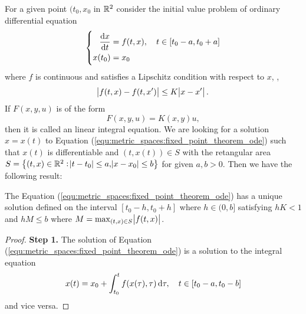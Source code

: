 \begin{example}
For a given point $(t_0, x_0$ in $\mathbb{R}^2$ consider the initial value problem 
of ordinary differential equation 
\begin{equation}
    \label{equ:metric_spaces:fixed_point_theorem_ode}
    \left\{
    \begin{aligned}
        \frac{\mathop{}\!\mathrm{d} x}{\mathop{}\!\mathrm{d} t} &= f(t, x), \quad
        t \in \left[ t_0 - a, t_0 + a \right] \\
        x(t_0) &= x_0
    \end{aligned}
    \right.
\end{equation}
where $f$ is continuous and satisfies a Lipschitz condition with respect to 
$x$, \ie, 
\begin{equation*}
    \abs{f(t, x) - f(t, x')} \le K \abs{x - x'}. 
\end{equation*}
If $F(x, y, u)$ is of the form 
\begin{equation*}
    F(x, y, u) = K(x, y)u, 
\end{equation*}
then it is called an linear integral equation. 
We are looking for a solution $x = x(t)$ to Equation 
(\ref{equ:metric_spaces:fixed_point_theorem_ode}) such that $x(t)$ is 
differentiable and $(t, x(t)) \in S$ with the retangular area $S = \left\{ 
(t, x) \in \mathbb{R}^2: \abs{t - t_0} \le a, \abs{x - x_0} \le b \right\}$ for 
given $a, b > 0$. 
Then we have the following result: 
\begin{thm}
The Equation (\ref{equ:metric_spaces:fixed_point_theorem_ode}) has a unique 
solution defined on the interval $[t_0 - h, t_0 + h]$ where $h \in (0, b]$ 
satisfying $h K < 1$ and $hM \le b$ where $M = \max_{(t, x) \in S} 
\abs{f(t, x)}$. 
\end{thm}
\begin{proof}
\textbf{Step 1.}
The solution of Equation (\ref{equ:metric_spaces:fixed_point_theorem_ode}) 
is a solution to the integral equation 
\begin{equation}
    \label{equ:metric_spaces:fixed_point_theorem_ode:integral}
    x(t) = x_0 + \int_{t_0}^{t} f(x(\tau), \tau) \mathop{}\!\mathrm{d} \tau, \quad 
    t \in [t_0 - a, t_0 - b]
\end{equation}
and vice versa. 


\end{proof}
\end{example}
